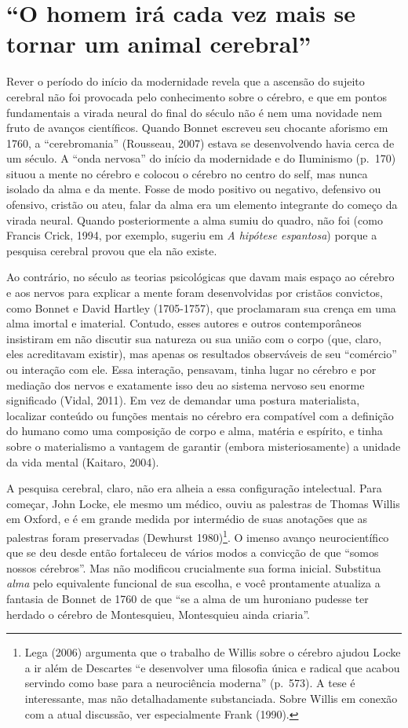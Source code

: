 \chapter{``O homem irá cada vez mais se tornar um animal cerebral''}

Rever o período do início da modernidade revela que a ascensão do
sujeito cerebral não foi provocada pelo conhecimento sobre o cérebro, e
que em pontos fundamentais a virada neural do final do século  não é
nem uma novidade nem fruto de avanços científicos. Quando Bonnet
escreveu seu chocante aforismo em 1760, a ``cerebromania'' (Rousseau,
2007) estava se desenvolvendo havia cerca de um século. A ``onda
nervosa'' do início da modernidade e do Iluminismo (p.~170) situou a
mente no cérebro e colocou o cérebro no centro do self, mas nunca
isolado da alma e da mente. Fosse de modo positivo ou negativo,
defensivo ou ofensivo, cristão ou ateu, falar da alma era um elemento
integrante do começo da virada neural. Quando posteriormente a alma
sumiu do quadro, não foi (como Francis Crick, 1994, por exemplo, sugeriu
em \emph{A hipótese espantosa}) porque a pesquisa cerebral provou que
ela não existe.

Ao contrário, no século  as teorias psicológicas que davam mais
espaço ao cérebro e aos nervos para explicar a mente foram desenvolvidas
por cristãos convictos, como Bonnet e David Hartley (1705-1757), que
proclamaram sua crença em uma alma imortal e imaterial. Contudo, esses
autores e outros contemporâneos insistiram em não discutir sua natureza
ou sua união com o corpo (que, claro, eles acreditavam existir), mas
apenas os resultados observáveis de seu ``comércio'' ou interação com
ele. Essa interação, pensavam, tinha lugar no cérebro e por mediação dos
nervos e exatamente isso deu ao sistema nervoso seu enorme significado
(Vidal, 2011). Em vez de demandar uma postura materialista, localizar
conteúdo ou funções mentais no cérebro era compatível com a definição do
humano como uma composição de corpo e alma, matéria e espírito, e tinha
sobre o materialismo a vantagem de garantir (embora misteriosamente) a
unidade da vida mental (Kaitaro, 2004).

A pesquisa cerebral, claro, não era alheia a essa configuração
intelectual. Para começar, John Locke, ele mesmo um médico, ouviu as
palestras de Thomas Willis em Oxford, e é em grande medida por
intermédio de suas anotações que as palestras foram preservadas
(Dewhurst 1980)\footnote[9]{Lega (2006) argumenta que o trabalho de Willis sobre o cérebro
ajudou Locke a ir além de Descartes ``e desenvolver uma filosofia única
e radical que acabou servindo como base para a neurociência moderna''
(p.~573). A tese é interessante, mas não detalhadamente substanciada.
Sobre Willis em conexão com a atual discussão, ver especialmente Frank
(1990).}. O imenso avanço neurocientífico que
se deu desde então fortaleceu de vários modos a convicção de que ``somos
nossos cérebros''. Mas não modificou crucialmente sua forma inicial.
Substitua \emph{alma} pelo equivalente funcional de sua escolha, e você
prontamente atualiza a fantasia de Bonnet de 1760 de que ``se a alma de
um huroniano pudesse ter herdado o cérebro de Montesquieu, Montesquieu
ainda criaria''.

